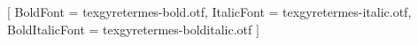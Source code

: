 

\usepackage{fontspec}
\setmainfont{texgyretermes-regular.otf}[
  BoldFont = texgyretermes-bold.otf,
  ItalicFont = texgyretermes-italic.otf,
  BoldItalicFont = texgyretermes-bolditalic.otf
]